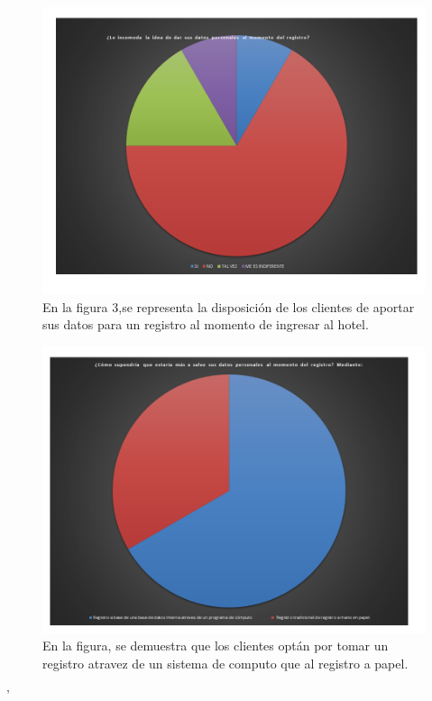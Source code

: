 \documentclass[a4paper,10pt]{report}
\begin{document}
\begin{figure}[H]
\centering
\includegraphics[scale=.7]{imagenes/Diapositiva3.PNG}
\caption{En la figura 3,se representa la disposición de los clientes de aportar sus datos para un registro al momento de ingresar al hotel.}
\end{figure}

\begin{figure}[H]
\centering
\includegraphics[scale=.7]{imagenes/Diapositiva4.PNG}
\caption{En la figura, se demuestra que los clientes optán por tomar un registro atravez de un sistema de computo que al registro a papel. }
\end{figure}' 
\end{document}
